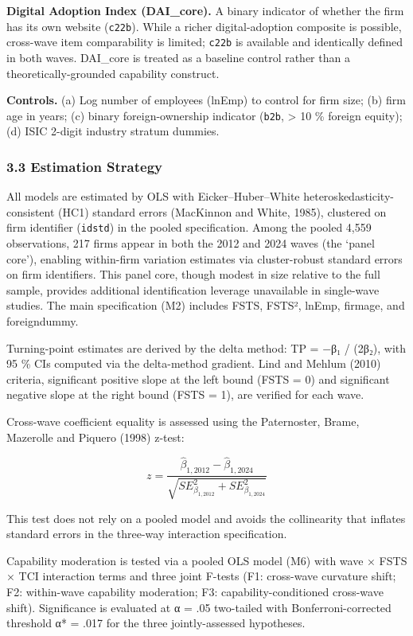\documentclass[
  12pt,a4paper]{article}
\begin{document}
\textbf{Digital Adoption Index (DAI\_core).} A binary indicator of
whether the firm has its own website (\texttt{c22b}). While a richer
digital-adoption composite is possible, cross-wave item comparability is
limited; \texttt{c22b} is available and identically defined in both
waves. DAI\_core is treated as a baseline control rather than a
theoretically-grounded capability construct.

\textbf{Controls.} (a) Log number of employees (lnEmp) to control for
firm size; (b) firm age in years; (c) binary foreign-ownership indicator
(\texttt{b2b}, \textgreater{} 10 \% foreign equity); (d) ISIC 2-digit
industry stratum dummies.

\hypertarget{estimation-strategy}{%
\subsubsection{3.3 Estimation Strategy}\label{estimation-strategy}}

All models are estimated by OLS with Eicker--Huber--White
heteroskedasticity-consistent (HC1) standard errors (MacKinnon and
White, 1985), clustered on firm identifier (\texttt{idstd}) in the
pooled specification. Among the pooled 4,559 observations, 217 firms
appear in both the 2012 and 2024 waves (the `panel core'), enabling
within-firm variation estimates via cluster-robust standard errors on
firm identifiers. This panel core, though modest in size relative to the
full sample, provides additional identification leverage unavailable in
single-wave studies. The main specification (M2) includes FSTS, FSTS²,
lnEmp, firmage, and foreigndummy.

Turning-point estimates are derived by the delta method: TP = −β₁ /
(2β₂), with 95 \% CIs computed via the delta-method gradient. Lind and
Mehlum (2010) criteria, significant positive slope at the left bound
(FSTS = 0) and significant negative slope at the right bound (FSTS = 1),
are verified for each wave.

Cross-wave coefficient equality is assessed using the Paternoster,
Brame, Mazerolle and Piquero (1998) z-test:

\[z = \frac{{\widehat{\beta}}_{1, 2012} - {\widehat{\beta}}_{1, 2024}}{\sqrt{SE_{\beta_{1, 2012}}^{2} + SE_{\beta_{1, 2024}}^{2}}}\]

This test does not rely on a pooled model and avoids the collinearity
that inflates standard errors in the three-way interaction
specification.

Capability moderation is tested via a pooled OLS model (M6) with wave ×
FSTS × TCI interaction terms and three joint F-tests (F1: cross-wave
curvature shift; F2: within-wave capability moderation; F3:
capability-conditioned cross-wave shift). Significance is evaluated at α
= .05 two-tailed with Bonferroni-corrected threshold α* = .017 for the
three jointly-assessed hypotheses.
\end{document}
